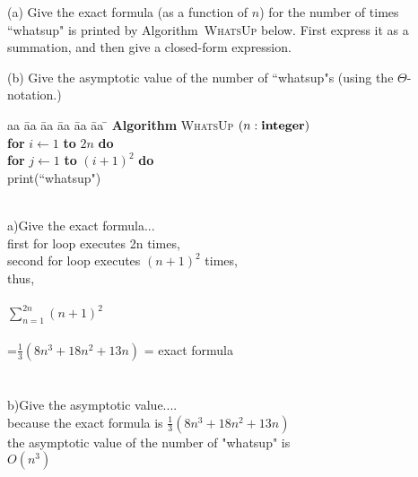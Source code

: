 \documentclass[11pt]{article}
\begin{document}

\medskip


\lineacross


\begin{problem}
	(a)
Give the exact formula (as a function of $n$) for the number of
times ``whatsup" is printed by Algorithm~\textsc{WhatsUp} below.
First express it as a summation, and then give a closed-form expression.

\noindent
(b)
Give the asymptotic value of the
number of ``whatsup"s (using the $\Theta$-notation.)

\begin{tabbing}
aa \= aa \= aa \= aa \= aa \= aa \= \kill
\textbf{Algorithm} \textsc{WhatsUp} $(n: \mbox{\bf integer})$ \\
      \> \textbf{for} $i \leftarrow 1$ \textbf{to} $2n$
                         \textbf{do} \\
      \> \> \textbf{for} $j \leftarrow 1$ \textbf{to} $(i+1)^2$ \textbf{do} \\
      \> \> \> print(``whatsup")
\end{tabbing}
\end{problem}


\begin{solution}
	\\a)Give the exact formula...
	\\first for loop executes 2n times,
	\\second for loop executes $(n+1)^2$ times,
	\\thus,\\
	\\$\sum_{n=1}^{2n} (n+1)^{2}$\\
	\\=$\frac{1}{3}(8n^{3}+18n^{2}+13n)$ = exact formula
    \\\\
    \\b)Give the asymptotic value....
    \\because the exact formula is $\frac{1}{3}(8n^{3}+18n^{2}+13n)$
    \\the asymptotic value of the number of "whatsup" is
    \\$O(n^{3})$
\end{solution}
\end{document}
